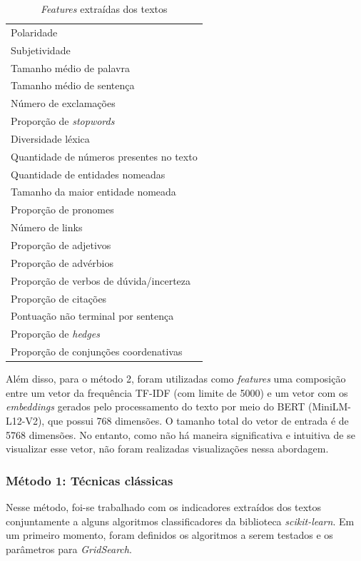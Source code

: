 \documentclass[12pt]{article}
\begin{document}
\begin{table}[H]
	\centering
	\begin{tabular}{|l|}
	\hline
		Polaridade \\
		Subjetividade \\
		Tamanho médio de palavra  \\
		Tamanho médio de sentença \\
		Número de exclamações \\
		Proporção de \textit{stopwords} \\
		Diversidade léxica \\
		Quantidade de números presentes no texto \\
		Quantidade de entidades nomeadas \\
		Tamanho da maior entidade nomeada \\
		Proporção de pronomes \\
		Número de links \\
		Proporção de adjetivos  \\
		Proporção de advérbios \\
		Proporção de verbos de dúvida/incerteza \\
		Proporção de citações \\
		Pontuação não terminal por sentença \\
		Proporção de \textit{hedges} \\
		Proporção de conjunções coordenativas \\
	\hline
	\end{tabular}
	\label{tab:features}
	\caption{\textit{Features} extraídas dos textos}
\end{table}

Além disso, para o método 2, foram utilizadas como \textit{features} uma composição entre um vetor da frequência TF-IDF (com limite de 5000) e um vetor com os \textit{embeddings} gerados pelo processamento do texto por meio do BERT (MiniLM-L12-V2), que possui 768 dimensões. O tamanho total do vetor de entrada é de 5768 dimensões. No entanto, como não há maneira significativa e intuitiva de se visualizar esse vetor, não foram realizadas visualizações nessa abordagem.

\subsubsection{Método 1: Técnicas clássicas}

Nesse método, foi-se trabalhado com os indicadores extraídos dos textos conjuntamente a alguns algoritmos classificadores da biblioteca \textit{scikit-learn}. Em um primeiro momento, foram definidos os algoritmos a serem testados e os parâmetros para \textit{GridSearch}.
\end{document}
